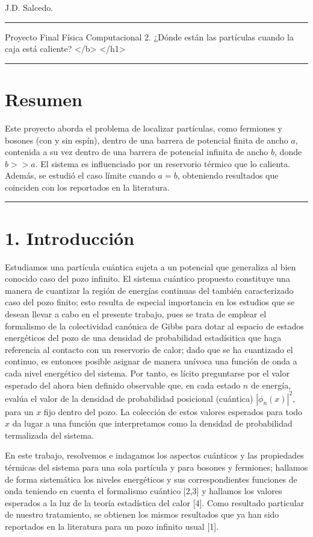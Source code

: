 \documentclass[11pt]{article}
\date{\today}
\title{}
\begin{document}
\tableofcontents

J.D. Salcedo.

\noindent\rule{\textwidth}{0.5pt}

Proyecto Final Física Computacional 2.
¿Dónde están las partículas cuando la caja está caliente? </b> </h1>

\noindent\rule{\textwidth}{0.5pt}
\section{\textbf{Resumen}}
\label{sec:org88c7a85}
Este proyecto aborda el problema de localizar partículas, como fermiones
y bosones (con y sin espín), dentro de una barrera de potencial finita
de ancho \(a\), contenida a su vez dentro de una barrera de potencial
infinita de ancho \(b\), donde \(b >> a\). El sistema es influenciado
por un reservorio térmico que lo calienta. Además, se estudió el caso
límite cuando \(a = b\), obteniendo resultados que coinciden con los
reportados en la literatura.

\noindent\rule{\textwidth}{0.5pt}
\section{\textbf{1. Introducción}}
\label{sec:orgdaa2dc7}
Estudiamos una partícula cuántica sujeta a un potencial que generaliza
al bien conocido caso del pozo infinito. El sistema cuántico propuesto
constituye una manera de cuantizar la región de energías continuas del
también caracterizado caso del pozo finito; esto resulta de especial
importancia en los estudios que se desean llevar a cabo en el presente
trabajo, pues se trata de emplear el formalismo de la colectividad
canónica de Gibbs para dotar al espacio de estados energéticos del pozo
de una densidad de probabilidad estadísitica que haga referencia al
contacto con un reservorio de calor; dado que se ha cuantizado el
continuo, es entonces posible asignar de manera unívoca una función de
onda a cada nivel energético del sistema. Por tanto, es lícito
preguntarse por el valor esperado del ahora bien definido observable
que, en cada estado \(n\) de energía, evalúa el valor de la densidad de
probabilidad posicional (cuántica) \(|\phi_n(x)|^2\), para un \(x\) fijo
dentro del pozo. La colección de estos valores esperados para todo \(x\)
da lugar a una función que interpretamos como la densidad de
probabilidad termalizada del sistema.

En este trabajo, resolvemos e indagamos los aspectos cuánticos y las
propiedades térmicas del sistema para una sola partícula y para bosones
y fermiones; hallamos de forma sistemática los niveles energéticos y sus
correspondientes funciones de onda teniendo en cuenta el formalismo
cuántico [2,3] y hallamos los valores esperados a la luz
de la teoría estadística del calor [4]. Como resultado particular
de nuestro tratamiento, se obtienen los mismos resultados que ya han
sido reportados en la literatura para un pozo infinito usual [1].
\end{document}
